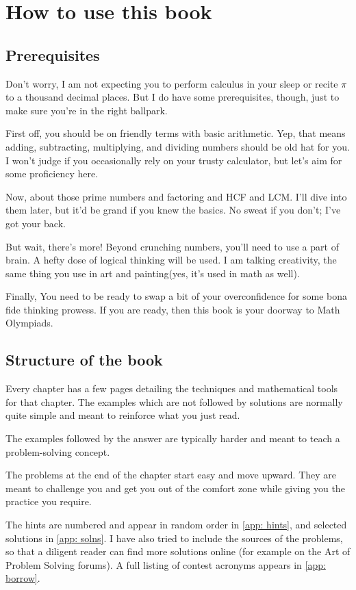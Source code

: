 \chapter*{How to use this book}
\section{Prerequisites}

Don't worry, I am not expecting you to perform calculus in your sleep or recite $\pi$ to a thousand decimal places.
But I do have some prerequisites, though, just to make sure you're in the right ballpark.\par
First off, you should be on friendly terms with basic arithmetic. Yep, that means adding, subtracting, multiplying, and dividing numbers
should be old hat for you. I won't judge if you occasionally rely on your trusty calculator, but let's aim for some proficiency here.
\par\medskip
Now, about those prime numbers and factoring and HCF and LCM. I'll dive into them later, 
but it'd be grand if you knew the basics. No sweat if you don't; I've got your back.\par\medskip
But wait, there's more! Beyond crunching numbers, you'll need to use a part of brain. 
A hefty dose of logical thinking will be used. I am talking creativity, the same thing you use in art and 
painting(yes, it's used in math as well).\par
Finally, You need to be ready to swap a bit of your overconfidence for some bona fide thinking prowess. 
If you are ready, then this book is your doorway to Math Olympiads.

\section{Structure of the book}
Every chapter has a few pages detailing the techniques and mathematical tools for that chapter.
The examples which are not followed by solutions are normally quite simple and meant to reinforce 
what you just read.\par
The examples followed by the answer are typically harder and meant to teach a problem-solving concept.\par
The problems at the end of the chapter start easy and move upward. 
They are meant to challenge you and get you out of the comfort zone while giving you the practice you require.
\par\medskip
The hints are numbered and appear in random order in \cref{app: hints}, and selected solutions 
in \cref{app: solns}. 
I have also tried to include the sources of the problems, so that a diligent reader can find more solutions online 
(for example on the Art of Problem Solving forums). A full listing of contest acronyms appears in \cref{app: borrow}.

